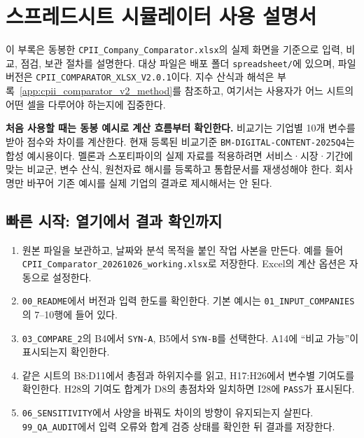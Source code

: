 \chapter{스프레드시트 시뮬레이터 사용 설명서}
\label{app:simulator-manual}

이 부록은 동봉한 \nolinkurl{CPII_Company_Comparator.xlsx}의 실제 화면을 기준으로 입력, 비교, 점검, 보관 절차를 설명한다. 대상 파일은 배포 폴더 \nolinkurl{spreadsheet/}에 있으며, 파일 버전은 \nolinkurl{CPII_COMPARATOR_XLSX_V2.0.1}이다. 지수 산식과 해석은 부록~\ref{app:cpii_comparator_v2_method}를 참조하고, 여기서는 사용자가 어느 시트의 어떤 셀을 다루어야 하는지에 집중한다.

\begin{ReportCallout}
\textbf{처음 사용할 때는 동봉 예시로 계산 흐름부터 확인한다.} 비교기는 기업별 10개 변수를 받아 점수와 차이를 계산한다. 현재 등록된 비교기준 \nolinkurl{BM-DIGITAL-CONTENT-2025Q4}는 합성 예시용이다. 멜론과 스포티파이의 실제 자료를 적용하려면 서비스·시장·기간에 맞는 비교군, 변수 산식, 원천자료 해시를 등록하고 통합문서를 재생성해야 한다. 회사명만 바꾸어 기존 예시를 실제 기업의 결과로 제시해서는 안 된다.
\end{ReportCallout}

\section{빠른 시작: 열기에서 결과 확인까지}

\begin{enumerate}[leftmargin=1.8em,itemsep=0.45em]
\item 원본 파일을 보관하고, 날짜와 분석 목적을 붙인 작업 사본을 만든다. 예를 들어 \nolinkurl{CPII_Comparator_20261026_working.xlsx}로 저장한다. Excel의 계산 옵션은 자동으로 설정한다.
\item \nolinkurl{00_README}에서 버전과 입력 한도를 확인한다. 기본 예시는 \nolinkurl{01_INPUT_COMPANIES}의 7--10행에 들어 있다.
\item \nolinkurl{03_COMPARE_2}의 B4에서 \texttt{SYN-A}, B5에서 \texttt{SYN-B}를 선택한다. A14에 ``비교 가능''이 표시되는지 확인한다.
\item 같은 시트의 B8:D11에서 총점과 하위지수를 읽고, H17:H26에서 변수별 기여도를 확인한다. H28의 기여도 합계가 D8의 총점차와 일치하면 I28에 \texttt{PASS}가 표시된다.
\item \nolinkurl{06_SENSITIVITY}에서 사양을 바꿔도 차이의 방향이 유지되는지 살핀다. \nolinkurl{99_QA_AUDIT}에서 입력 오류와 합계 검증 상태를 확인한 뒤 결과를 저장한다.
\end{enumerate}


